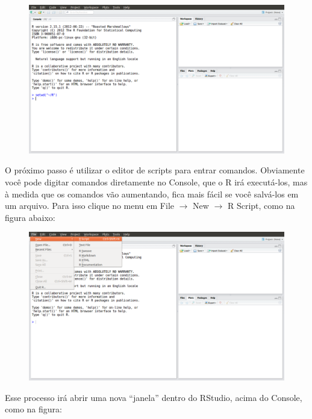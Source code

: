 \documentclass[a4paper,12pt]{article}\usepackage[]{graphicx}\usepackage[]{color}
\providecommand{\R}{\textsf{R}\xspace}
\providecommand{\RStudio}{\textsf{RStudio}\xspace}
\begin{document}
\begin{figure}[H]
  \centering
  \includegraphics[width=\textwidth]{figure/RStudio_006}
\end{figure}

O próximo passo é utilizar o editor de scripts para entrar
comandos. Obviamente você pode digitar comandos diretamente no
\textsf{Console}, que o \R irá executá-los, mas à medida que os comandos
vão aumentando, fica mais fácil se você salvá-los em um arquivo. Para
isso clique no menu em \textsf{File $\rightarrow$ New $\rightarrow$ R
  Script}, como na figura abaixo:

\begin{figure}[H]
  \centering
  \includegraphics[width=\textwidth]{figure/RStudio_010}
\end{figure}

Esse processo irá abrir uma nova ``janela'' dentro do \RStudio, acima do
\textsf{Console}, como na figura:
\end{document}
